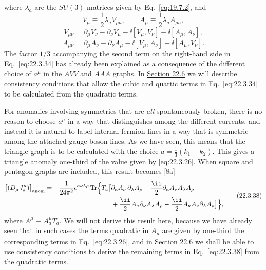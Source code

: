 where $\lambda_a$ are the $SU(3)$ matrices given by
Eq.~\eqref{eq:19.7.2}, and
\begin{equation}
 V_\mu\equiv\frac12\lambda_a V_{\mu a},
 \qquad
 A_\mu\equiv\frac12\lambda_a A_{\mu a},
 \tag{22.3.35}\label{eq:22.3.35}
\end{equation}
\begin{equation}
 V_{\mu\nu}
 =\partial_\mu V_\nu-\partial_\nu V_\mu
 -\ii[V_\mu,V_\nu]-\ii[A_\mu,A_\nu],
 \tag{22.3.36}\label{eq:22.3.36}
\end{equation}
\begin{equation}
 A_{\mu\nu}
 =\partial_\mu A_\nu-\partial_\nu A_\mu
 -\ii[V_\mu,A_\nu]-\ii[A_\mu,V_\nu].
 \tag{22.3.37}\label{eq:22.3.37}
\end{equation}
The factor $1/3$ accompanying the second term on the right-hand side in
Eq.~\eqref{eq:22.3.34} has already been explained as a consequence of the
different choice of $a^\mu$ in the $AVV$ and $AAA$ graphs. In
\hyperref[sec:22.6]{Section 22.6} we will describe consistency conditions
that allow the cubic and quartic terms in Eq.~\eqref{eq:22.3.34} to be
calculated from the quadratic terms.

For anomalies involving symmetries that are \emph{all} spontaneously
broken, there is no reason to choose $a^\mu$ in a way that distinguishes
among the different currents, and instead it is natural to label internal
fermion lines in a way that is symmetric among the attached gauge boson
lines. As we have seen, this means that the triangle graph is to be
calculated with the choice $a=\frac13(k_1-k_2)$. This gives a triangle
anomaly one-third of the value given by \eqref{eq:22.3.26}. When square and
pentagon graphs are included, this result becomes
\hyperref[ch22-ref-8a]{[8a]}
\begin{equation}
 \begin{aligned}
 \bigl[(D_\mu J_a^\mu)\bigr]_{\mathrm{anom}}
 =-\frac{1}{24\pi^2}\epsilon^{\kappa\nu\lambda\rho}
 \operatorname{Tr}\Bigl\{T_a\bigl[
 &\partial_\kappa A_\nu\,\partial_\lambda A_\rho
 -\frac{\ii}{2}\partial_\kappa A_\nu A_\lambda A_\rho
 \\
 &+\frac{\ii}{2}A_\kappa\partial_\nu A_\lambda A_\rho
 -\frac{\ii}{2}A_\kappa A_\nu\partial_\lambda A_\rho
 \bigr]\Bigr\},
 \end{aligned}
 \tag{22.3.38}\label{eq:22.3.38}
\end{equation}
where $A^\mu\equiv A_a^\mu T_a$. We will not derive this result
here, because we have already seen that in such cases the terms quadratic
in $A_\mu$ are given by one-third the corresponding terms in
Eq.~\eqref{eq:22.3.26}, and in \hyperref[sec:22.6]{Section 22.6} we shall
be able to use consistency conditions to derive the remaining terms in
Eq.~\eqref{eq:22.3.38} from the quadratic terms.

